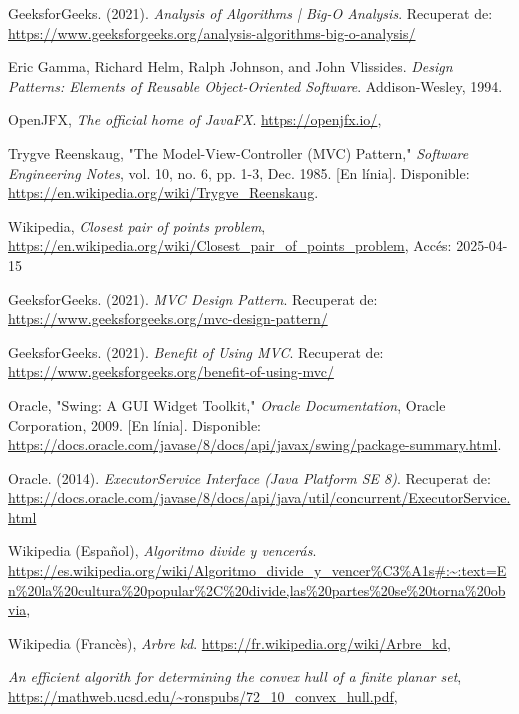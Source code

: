 \documentclass{ieeetj}
\begin{document}
\begin{thebibliography}{9}

GeeksforGeeks. (2021). \textit{Analysis of Algorithms | Big-O Analysis}. Recuperat de: \url{https://www.geeksforgeeks.org/analysis-algorithms-big-o-analysis/}

Eric Gamma, Richard Helm, Ralph Johnson, and John Vlissides. \emph{Design Patterns: Elements of Reusable Object-Oriented Software}. Addison-Wesley, 1994.

OpenJFX, \textit{The official home of JavaFX}.  
\url{https://openjfx.io/},  

Trygve Reenskaug, "The Model-View-Controller (MVC) Pattern," \textit{Software Engineering Notes}, vol. 10, no. 6, pp. 1-3, Dec. 1985. [En línia]. Disponible: \url{https://en.wikipedia.org/wiki/Trygve_Reenskaug}.

Wikipedia, \textit{Closest pair of points problem}, \url{https://en.wikipedia.org/wiki/Closest_pair_of_points_problem}, Accés: 2025-04-15


GeeksforGeeks. (2021). \textit{MVC Design Pattern}. Recuperat de: \url{https://www.geeksforgeeks.org/mvc-design-pattern/}

GeeksforGeeks. (2021). \textit{Benefit of Using MVC}. Recuperat de: \url{https://www.geeksforgeeks.org/benefit-of-using-mvc/}

Oracle, "Swing: A GUI Widget Toolkit," \textit{Oracle Documentation}, Oracle Corporation, 2009. [En línia]. Disponible: \url{https://docs.oracle.com/javase/8/docs/api/javax/swing/package-summary.html}.

Oracle. (2014). \textit{ExecutorService Interface (Java Platform SE 8)}. Recuperat de: \url{https://docs.oracle.com/javase/8/docs/api/java/util/concurrent/ExecutorService.html}

Wikipedia (Español), \textit{Algoritmo divide y vencerás}.  
\url{https://es.wikipedia.org/wiki/Algoritmo_divide_y_vencer%C3%A1s#:~:text=En%20la%20cultura%20popular%2C%20divide,las%20partes%20se%20torna%20obvia},  

Wikipedia (Francès), \textit{Arbre kd}.  
\url{https://fr.wikipedia.org/wiki/Arbre_kd},  

\textit{An efficient algorith for determining the convex hull of a finite planar set}, \url{https://mathweb.ucsd.edu/~ronspubs/72_10_convex_hull.pdf}, 


\end{thebibliography}
\end{document}
